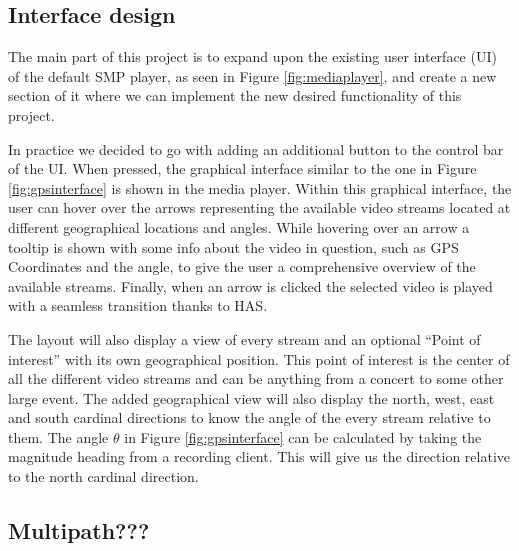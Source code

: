 \documentclass[9pt,a4paper]{acmproc}
\begin{document}
\subsection{Interface design}
The main part of this project is to expand upon the existing user interface (UI) of the default SMP player, as seen in Figure \ref{fig:mediaplayer}, and create a new section of it where we can implement the new desired functionality of this project. 

In practice we decided to go with adding an additional button to the control bar of the UI. When pressed, the graphical interface similar to the one in Figure \ref{fig:gpsinterface} is shown in the media player. Within this graphical interface, the user can hover over the arrows representing the available video streams located at different geographical locations and angles. While hovering over an arrow a tooltip is shown with some info about the video in question, such as GPS Coordinates and the angle, to give the user a comprehensive overview of the available streams. Finally, when an arrow is clicked the selected video is played with a seamless transition thanks to HAS.

The layout will also display a view of every stream and an optional “Point of interest” with its own geographical position. This point of interest is the center of all the different video streams and can be anything from a concert to some other large event. The added geographical view will also display the north, west, east and south cardinal directions to know the angle of the every stream relative to them. The angle $\theta$ in Figure \ref{fig:gpsinterface} can be calculated by taking the magnitude heading from a recording client. This will give us the direction relative to the north cardinal direction.

\subsection{Multipath???}
\end{document}

